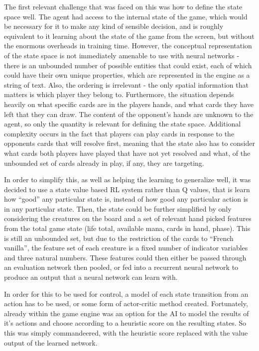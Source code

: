 The first relevant challenge that was faced on  this was how to define the state space well. The agent had access to the internal state of the game, which would be necessary for it to make any kind of sensible decision, and is roughly equivalent to it learning about the state of the game from the screen, but without the enormous overheads in training time. However, the conceptual representation of the state space is not immediately amenable to use with neural networks - there is an unbounded number of possible entities that could exist, each of which could have their own unique properties, which are represented in the engine as a string of text. Also, the ordering is irrelevant - the only spatial information that matters is which player they belong to. Furthermore, the situation depends heavily on what specific cards are in the players hands, and what cards they have left that they can draw. The content of the opponent's hands are unknown to the agent, so only the quantity is relevant for defining the state space. Additional complexity occurs in the fact that players can play cards in response to the opponents cards that will resolve first, meaning that the state also has to consider what cards both players have played that have not yet resolved and what, of the unbounded set of cards already in play, if any, they are targeting.

In order to simplify this, as well as helping the learning to generalize well, it was decided to use a state value based RL system rather than Q values, that is learn how ``good'' any particular state is, instead of how good any particular action is in any particular state. Then, the state could be further simplified by only considering the creatures on the board and a set of relevant hand picked features from the total game state (life total, available mana, cards in hand, phase). This is still an unbounded set, but due to the restriction of the cards to ``French vanilla'', the feature set of each creature is a fixed number of indicator variables and three natural numbers. These features could then either be passed through an evaluation network then pooled, or fed into a recurrent neural network to produce an output that a neural network can learn with. 

 In order for this to be used for control, a model of each state transition from an action has to be used, or some form of actor-critic method created. Fortunately, already within the game engine was an option for the AI to model the results of it's actions and choose according to a heuristic score on the resulting states. So this was simply commandeered, with the heuristic score replaced with the value output of the learned network.
 
